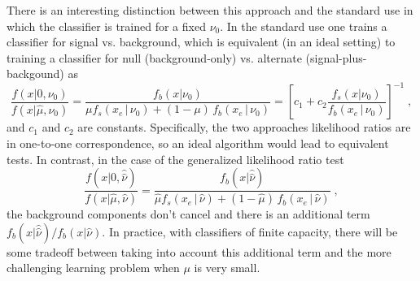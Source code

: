 \documentclass[11pt, oneside]{article}   	%
\begin{document}
There is an interesting distinction between this approach and the standard use in which the classifier is trained for a fixed $\nu_0$. In the standard use one trains a classifier for signal vs. background, which is equivalent (in an ideal setting) to training a classifier for  null (background-only) vs. alternate (signal-plus-backgound) as 
\begin{equation}
 \frac{f(x| 0, \nu_0)}{f(x|\hat \mu, \nu_0)} =  \frac{f_b(x| \nu_0)}{ \mu f_s( x_e \, |\,  \nu_0)  + (1-\mu)\, f_b( x_e \,|\, \nu_0)} = \left[ c_1 + c_2   \frac{f_s(x| \nu_0)}{ f_b( x_e \,|\, \nu_0)} \right ]^{-1} \; ,
\end{equation}
and $c_1$ and $c_2$ are constants. Specifically, the two approaches likelihood ratios are in one-to-one correspondence, so an ideal algorithm would lead to equivalent tests. In contrast, in the case of the generalized likelihood ratio test 
\begin{equation}
 \frac{f(x| 0, \hat{\hat{ \nu}})}{f(x|\hat \mu, \hat\nu)} =  \frac{f_b(x| \hat{\hat{ \nu}})}{ \hat \mu f_s( x_e \, |\,  \hat\nu)  + (1- \hat \mu )\, f_b( x_e \,|\, \hat \nu)} \; ,
\end{equation}
the background components don't cancel and there is an additional term $f_b(x| \hat{\hat{ \nu}})/f_b(x| {\hat{ \nu}})$.
In practice, with classifiers of finite capacity, there will be some tradeoff between taking into account this additional term and the more challenging learning problem when $\mu$ is very small. 

%
\end{document}
